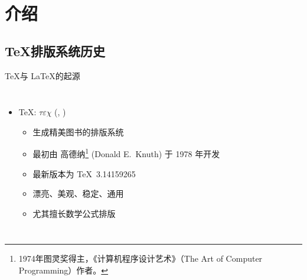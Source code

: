 

\section{介绍}

\subsection{\TeX 排版系统历史}

\begin{frame}[fragile]{\TeX 与 \LaTeX 的起源}
  \begin{columns}[T]
    \begin{itemize}
      \item \TeX: $\tau\varepsilon\chi$ (,
        )
        \begin{itemize}
          \item 生成精美图书的排版系统
          \item 最初由 高德纳\footnote{1974年图灵奖得主，《计算机程序设计艺术》（The Art of Computer Programming）作者。} (Donald E.~Knuth) 于 1978 年开发  
          \item 最新版本为 \TeX\ 3.14159265
          \item 漂亮、美观、稳定、通用
          \item 尤其擅长数学公式排版
        \end{itemize}


\end{itemize}
\end{columns}
\end{frame}
